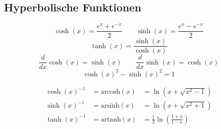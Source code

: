 \subsection{Hyperbolische Funktionen}
    $$ \cosh(x) = \frac{e^x + e^{-x}}{2} \qquad \sinh(x) = \frac{e^x - e^{-x}}{2}$$
    $$
        \tanh(x) = \frac{\sinh(x)}{\cosh(x)}
    $$
    $$
        \frac{d}{dx} \cosh(x) = \sinh(x) \qquad \frac{d}{dx} \sinh(x) = \cosh(x)
    $$
    $$
        \cosh(x)^2 - \sinh(x)^2 = 1
    $$

        \begin{align*}
            \cosh(x)^{-1} &= \textrm{arcosh}(x) &= \ln(x + \sqrt{x^2 - 1})\\
            \sinh(x)^{-1} &= \textrm{arsinh}(x) &= \ln(x + \sqrt{x^2 + 1})\\
            \tanh(x)^{-1} &= \textrm{artanh}(x) &= \frac{1}{2} \ln(\frac{1+x}{1-x})
        \end{align*}
